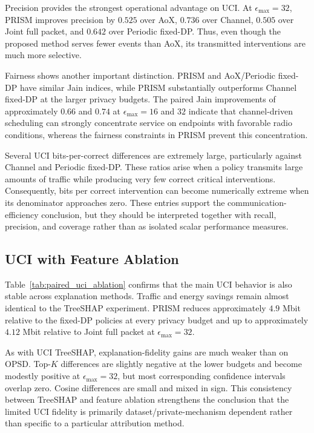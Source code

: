 \documentclass[11pt]{article}
\begin{document}
Precision provides the strongest operational advantage on UCI. At $\epsilon_{\max}=32$, PRISM improves precision by $0.525$ over AoX, $0.736$ over Channel, $0.505$ over Joint full packet, and $0.642$ over Periodic fixed-DP. Thus, even though the proposed method serves fewer events than AoX, its transmitted interventions are much more selective.

Fairness shows another important distinction. PRISM and AoX/Periodic fixed-DP have similar Jain indices, while PRISM substantially outperforms Channel fixed-DP at the larger privacy budgets. The paired Jain improvements of approximately $0.66$ and $0.74$ at $\epsilon_{\max}=16$ and $32$ indicate that channel-driven scheduling can strongly concentrate service on endpoints with favorable radio conditions, whereas the fairness constraints in PRISM prevent this concentration.

Several UCI bits-per-correct differences are extremely large, particularly against Channel and Periodic fixed-DP. These ratios arise when a policy transmits large amounts of traffic while producing very few correct critical interventions. Consequently, bits per correct intervention can become numerically extreme when its denominator approaches zero. These entries support the communication-efficiency conclusion, but they should be interpreted together with recall, precision, and coverage rather than as isolated scalar performance measures.

\subsection{UCI with Feature Ablation}

Table~\ref{tab:paired_uci_ablation} confirms that the main UCI behavior is also stable across explanation methods. Traffic and energy savings remain almost identical to the TreeSHAP experiment. PRISM reduces approximately $4.9$ Mbit relative to the fixed-DP policies at every privacy budget and up to approximately $4.12$ Mbit relative to Joint full packet at $\epsilon_{\max}=32$.

As with UCI TreeSHAP, explanation-fidelity gains are much weaker than on OPSD. Top-$K$ differences are slightly negative at the lower budgets and become modestly positive at $\epsilon_{\max}=32$, but most corresponding confidence intervals overlap zero. Cosine differences are small and mixed in sign. This consistency between TreeSHAP and feature ablation strengthens the conclusion that the limited UCI fidelity is primarily dataset/private-mechanism dependent rather than specific to a particular attribution method.
\end{document}

